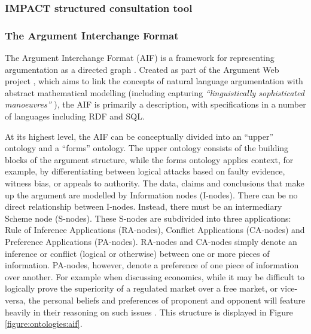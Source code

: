\subsubsection{IMPACT structured consultation tool}
 \citep{wyner2011towards}

\subsubsection{The Argument Interchange Format}
The Argument Interchange Format (AIF) is a framework for representing argumentation as a directed graph \citep{Chesnevar2006}. Created as part of the Argument Web project \citep{Rahwan2007a}, which aims to link the concepts of natural language argumentation with abstract mathematical modelling (including capturing \textit{``linguistically sophisticated manoeuvres''} \citep{Bex2013}), the AIF is primarily a description, with specifications in a number of languages including RDF and SQL.

At its highest level, the AIF can be conceptually divided into an ``upper'' ontology and a ``forms'' ontology. The upper ontology consists of the building blocks of the argument structure, while the forms ontology applies context, for example, by differentiating between logical attacks based on faulty evidence, witness bias, or appeals to authority. The data, claims and conclusions that make up the argument are modelled by Information nodes (I-nodes). There can be no direct relationship between I-nodes. Instead, there must be an intermediary Scheme node (S-nodes). These S-nodes are subdivided into three applications: Rule of Inference Applications (RA-nodes), Conflict Applications (CA-nodes) and Preference Applications (PA-nodes). RA-nodes and CA-nodes simply denote an inference or conflict (logical or otherwise) between one or more pieces of information. PA-nodes, however, denote a preference of one piece of information over another. For example when discussing economics, while it may be difficult to logically prove the superiority of a regulated market over a free market, or vice-versa, the personal beliefs and preferences of proponent and opponent will feature heavily in their reasoning on such issues \citep{Bench-Capon2002}. This structure is displayed in Figure \ref{figure:ontologies:aif}.

